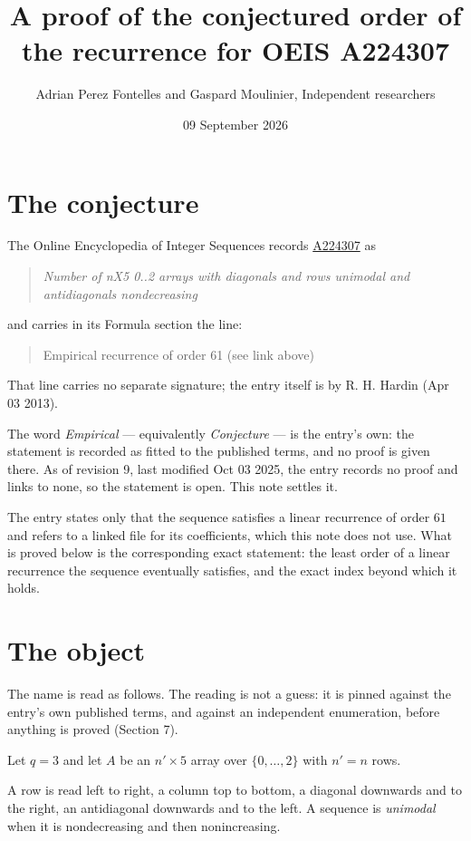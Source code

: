 \documentclass[11pt]{article}
\title{A proof of the conjectured order of the recurrence for OEIS A224307}
\author{Adrian Perez Fontelles and Gaspard Moulinier, Independent researchers}
\date{09 September 2026}
\theoremstyle{definition}
\begin{document}
\maketitle
\section{The conjecture}

The Online Encyclopedia of Integer Sequences records \href{https://oeis.org/A224307}{A224307} as

\begin{quote}\itshape Number of nX5 0..2 arrays with diagonals and rows unimodal and antidiagonals nondecreasing\end{quote}

and carries in its Formula section the line:

\begin{quote}\ttfamily Empirical recurrence of order 61 (see link above)\end{quote}

That line carries no separate signature; the entry itself is by R. H. Hardin (Apr 03 2013).

The word {\itshape Empirical} --- equivalently {\itshape Conjecture} --- is the entry's own: the statement is recorded as fitted to the published terms, and no proof is given there. As of revision 9, last modified Oct 03 2025, the entry records no proof and links to none, so the statement is open. This note settles it.

The entry states only that the sequence satisfies a linear recurrence of order $61$ and refers to a linked file for its coefficients, which this note does not use. What is proved below is the corresponding exact statement: the least order of a linear recurrence the sequence eventually satisfies, and the exact index beyond which it holds.

\section{The object}

The name is read as follows. The reading is not a guess: it is pinned against the entry's own published terms, and against an independent enumeration, before anything is proved (Section 7).

Let $q = 3$ and let $A$ be an $n' \times 5$ array over $\{0,\dots,2\}$ with $n' = n$ rows.

A row is read left to right, a column top to bottom, a diagonal downwards and to the right, an antidiagonal downwards and to the left. A sequence is {\itshape unimodal} when it is nondecreasing and then nonincreasing.
\end{document}
